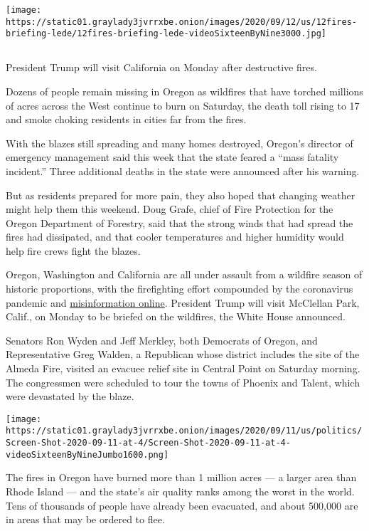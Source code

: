\texttt{[image: https://static01.graylady3jvrrxbe.onion/images/2020/09/12/us/12fires-briefing-lede/12fires-briefing-lede-videoSixteenByNine3000.jpg]}

\subsection{}

President Trump will visit California on Monday after destructive fires.

Dozens of people remain missing in Oregon as wildfires that have torched
millions of acres across the West continue to burn on Saturday, the
death toll rising to 17 and smoke choking residents in cities far from
the fires.

With the blazes still spreading and many homes destroyed, Oregon's
director of emergency management said this week that the state feared a
``mass fatality incident.'' Three additional deaths in the state were
announced after his warning.

But as residents prepared for more pain, they also hoped that changing
weather might help them this weekend. Doug Grafe, chief of Fire
Protection for the Oregon Department of Forestry, said that the strong
winds that had spread the fires had dissipated, and that cooler
temperatures and higher humidity would help fire crews fight the blazes.

Oregon, Washington and California are all under assault from a wildfire
season of historic proportions, with the firefighting effort compounded
by the coronavirus pandemic and
\href{https://www.nytimes3xbfgragh.onion/2020/09/10/us/wildfires-misinformation-arson-activists.html}{misinformation
online}. President Trump will visit McClellan Park, Calif., on Monday to
be briefed on the wildfires, the White House announced.

Senators Ron Wyden and Jeff Merkley, both Democrats of Oregon, and
Representative Greg Walden, a Republican whose district includes the
site of the Almeda Fire, visited an evacuee relief site in Central Point
on Saturday morning. The congressmen were scheduled to tour the towns of
Phoenix and Talent, which were devastated by the blaze.

\texttt{[image: https://static01.graylady3jvrrxbe.onion/images/2020/09/11/us/politics/Screen-Shot-2020-09-11-at-4/Screen-Shot-2020-09-11-at-4-videoSixteenByNineJumbo1600.png]}

The fires in Oregon have burned more than 1 million acres --- a larger
area than Rhode Island --- and the state's air quality ranks among the
worst in the world. Tens of thousands of people have already been
evacuated, and about 500,000 are in areas that may be ordered to flee.

